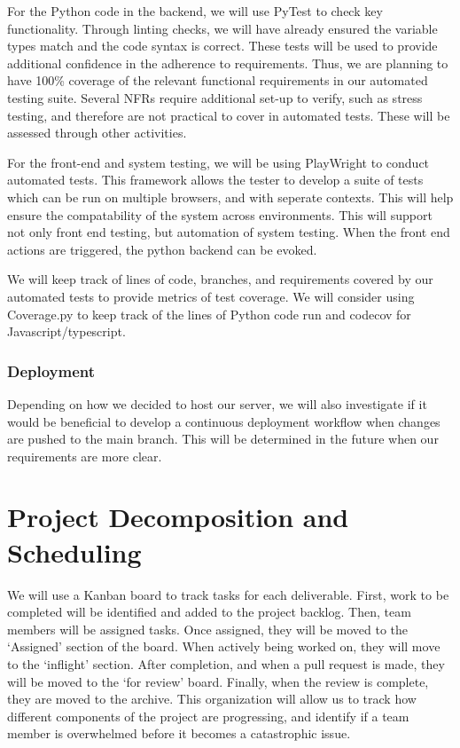 \documentclass{article}
\begin{document}
For the Python code in the backend, we will use PyTest to check key functionality. Through linting checks, we will have already ensured the variable types match and the code syntax is correct.
These tests will be used to provide additional confidence in the adherence to requirements. Thus, we are planning to have 100\% coverage of the relevant functional requirements in our automated testing suite.
Several NFRs require additional set-up to verify, such as stress testing, and therefore are not practical to cover in automated tests. These will be assessed through other activities.

For the front-end and system testing, we will be using PlayWright to conduct automated tests. This framework allows the tester to develop a suite of tests which can be run on multiple browsers, 
and with seperate contexts. This will help ensure the compatability of the system across environments. This will support not only front end testing, but automation of system testing. When the front end actions
are triggered, the python backend can be evoked.

We will keep track of lines of code, branches, and requirements covered by our automated tests to provide metrics of test coverage. We will consider using Coverage.py to keep track of the lines of Python code run and codecov for Javascript/typescript. 
\subsubsection{Deployment}
Depending on how we decided to host our server, we will also investigate if it would be beneficial to develop a continuous deployment workflow when changes are 
pushed to the main branch. This will be determined in the future when our requirements are more clear.
\section{Project Decomposition and Scheduling}


We will use a Kanban board to track tasks for each deliverable. First, work to be completed will be identified and added to the project backlog.
Then, team members will be assigned tasks. Once assigned, they will be moved to the `Assigned' section of the board. When actively being worked on, they will
move to the `inflight' section. After completion, and when a pull request is made, they will be moved to the `for review' board. Finally, when the review is
complete, they are moved to the archive. This organization will allow us to track how different components of the project are progressing, and identify
if a team member is overwhelmed before it becomes a catastrophic issue.
\end{document}
